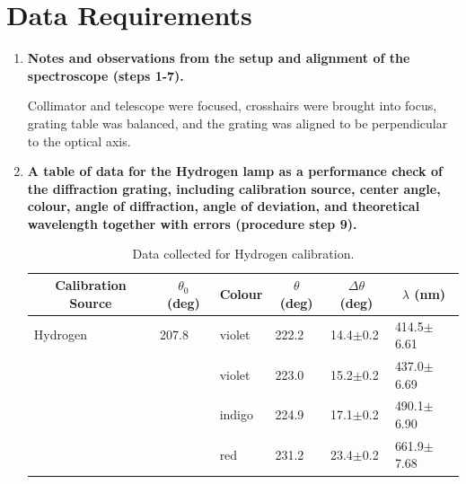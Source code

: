 \documentclass[justified]{tufte-book}
\begin{document}
\section{Data Requirements}
\begin{enumerate}

\item {\bf Notes and observations from the setup and alignment of the spectroscope (steps 1-7).}\newline

Collimator and telescope were focused, crosshairs were brought into focus, grating table was balanced, and the grating was aligned to be perpendicular to the optical axis.

\item {\bf A table of data for the Hydrogen lamp as a performance check of the diffraction grating, including calibration source, center angle, colour, angle of diffraction, angle of deviation, and theoretical wavelength together with errors (procedure step 9).}\newline

\begin{table}[ht]
\center
\begin{tabular}{|l|l|l|l|l|l|}
\hline
\multicolumn{1}{|c|}{Calibration Source} & \multicolumn{1}{c|}{$\theta_0$ (deg)} & \multicolumn{1}{c|}{Colour} & \multicolumn{1}{c|}{$\theta$ (deg)} & \multicolumn{1}{c|}{$\Delta\theta$ (deg)} & \multicolumn{1}{c|}{$\lambda$ (nm)} \\ \hline
Hydrogen                                 & 207.8                                 & violet                      & 222.2                               & 14.4$\pm$0.2                              & 414.5$\pm$6.61                      \\ \hline
                                         &                                       & violet                      & 223.0                               & 15.2$\pm$0.2                              & 437.0$\pm$6.69                      \\ \hline
                                         &                                       & indigo                      & 224.9                               & 17.1$\pm$0.2                              & 490.1$\pm$6.90                      \\ \hline
                                         &                                       & red                         & 231.2                               & 23.4$\pm$0.2                              & 661.9$\pm$7.68                      \\ \hline
\end{tabular}
\caption{Data collected for Hydrogen calibration.}
\label{tab:spcg2}
\end{table}


\end{enumerate}
\end{document}
